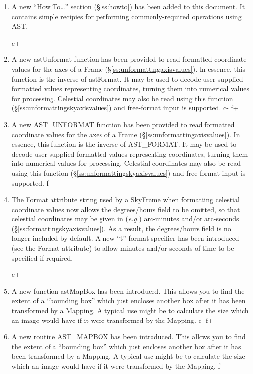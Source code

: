 \documentclass[twoside,11pt]{article}
\newcommand{\secref}[1]{\S\ref{#1}}
\newcommand{\secref}[1]{\ref{#1}}
\begin{document}
\begin{enumerate}

\item A new ``How To\ldots'' section (\secref{ss:howto}) has been
added to this document. It contains simple recipies for performing
commonly-required operations using AST.

c+
\item A new astUnformat function has been provided to read formatted
coordinate values for the axes of a Frame
(\secref{ss:unformattingaxisvalues}). In essence, this function is the
inverse of astFormat. It may be used to decode user-supplied formatted
values representing coordinates, turning them into numerical values
for processing. Celestial coordinates may also be read using this
function (\secref{ss:unformattingskyaxisvalues}) and free-format input
is supported.
c-
f+
\item A new AST\_UNFORMAT function has been provided to read formatted
coordinate values for the axes of a Frame
(\secref{ss:unformattingaxisvalues}). In essence, this function is the
inverse of AST\_FORMAT. It may be used to decode user-supplied
formatted values representing coordinates, turning them into numerical
values for processing.  Celestial coordinates may also be read using
this function (\secref{ss:unformattingskyaxisvalues}) and free-format
input is supported.
f-

\item The Format attribute string used by a SkyFrame when formatting
celestial coordinate values now allows the degrees/hours field to be
omitted, so that celestial coordinates may be given in ({\em{e.g.}})
arc-minutes and/or arc-seconds
(\secref{ss:formattingskyaxisvalues}). As a result, the degrees/hours
field is no longer included by default.  A new ``t'' format specifier
has been introduced (see the Format attribute) to allow minutes and/or
seconds of time to be specified if required.

c+
\item A new function astMapBox has been introduced. This allows you to
find the extent of a ``bounding box'' which just encloses another box
after it has been transformed by a Mapping. A typical use might be to
calculate the size which an image would have if it were transformed by
the Mapping.
c-
f+
\item A new routine AST\_MAPBOX has been introduced. This allows you
to find the extent of a ``bounding box'' which just encloses another
box after it has been transformed by a Mapping. A typical use might be
to calculate the size which an image would have if it were transformed
by the Mapping.
f-


\end{enumerate}
\end{document}
